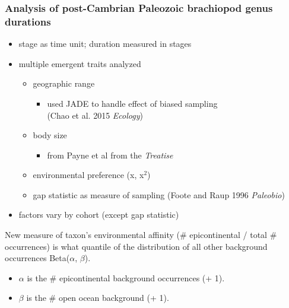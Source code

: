 \documentclass{beamer}
\begin{document}
\begin{frame}
  \frametitle{Analysis of post-Cambrian Paleozoic brachiopod genus durations}
  \begin{itemize}
    \item stage as time unit; duration measured in stages
    \item multiple emergent traits analyzed
      \begin{itemize}
        \item geographic range
          \begin{itemize}
            \item used JADE to handle effect of biased sampling \\(Chao et al. 2015 \textit{Ecology})
          \end{itemize}
        \item body size
          \begin{itemize}
            \item from Payne et al from the \textit{Treatise}
          \end{itemize}
        \item environmental preference (x, x\(^2\))
        \item gap statistic as measure of sampling (Foote and Raup 1996 \textit{Paleobio})
      \end{itemize}
    \item factors vary by cohort (except gap statistic)
  \end{itemize}
\end{frame}

\begin{frame}
  \begin{block}{New measure of taxon's environmental affinity}
    (\# epicontinental / total \# occurrences) is what quantile of the distribution of all other background occurrences Beta(\(\alpha\), \(\beta\)).
    \begin{itemize}
      \item \(\alpha\) is the \# epicontinental background occurrences (+ 1).
      \item \(\beta\) is the \# open ocean background (+ 1).
    \end{itemize}
  \end{block}
\end{frame}
\end{document}
